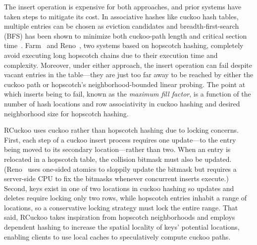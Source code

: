 The insert operation is expensive for both approaches, and prior
systems have taken steps to mitigate its cost.  In associative hashes
like cuckoo hash tables, multiple entries can be chosen as eviction
candidates and breadth-first-search (BFS) has been shown to minimize
both cuckoo-path length and critical section
time~\cite{memc3,cuckoo-improvements}.
Farm~\cite{farm} and Reno~\cite{reno}, two systems based on hopscotch
hashing, completely avoid executing long hopscotch chains due to their
execution time and complexity.  Moreover, under either approach, the
insert operation can fail despite vacant entries in the table---they
are just too far away to be reached by either the cuckoo path or
hopscotch's neighborhood-bounded linear probing.  The point at which
inserts being to fail, known as the \emph{maximum fill factor}, is a
function of the number of hash locations and row associativity in
cuckoo hashing and desired neighborhood size for hopscotch hashing.

RCuckoo uses cuckoo rather than hopscotch hashing due to locking
concerns.
First, each step of a cuckoo insert process requires one update---to
the entry being moved to its secondary location---rather than two.
When an entry is relocated in a hopscotch table, the collision bitmask
must also be updated.  (Reno~\cite{reno} uses one-sided atomics to
sloppily update the bitmask but requires a server-side CPU to fix the
bitmasks whenever concurrent inserts execute.)  Second, keys exist in
one of two locations in cuckoo hashing so updates and deletes require
locking only two rows, while hopscotch entries inhabit a range of
locations, so a conservative locking strategy must lock the entire
range.  That said, RCuckoo takes inspiration from hopscotch neighborhoods and employs dependent hashing to increase the spatial
locality of keys' potential locations, enabling clients to use local
caches to speculatively compute cuckoo paths.




